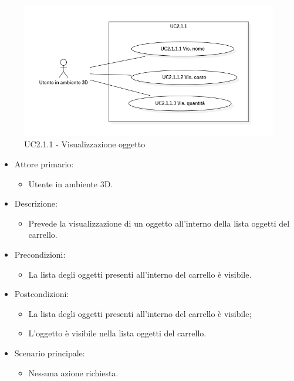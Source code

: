 \begin{figure}[H]
  \renewcommand{\thefigure}{4}
  \includegraphics[width=\linewidth]{./res/images/UC2.1.1.png}
  \caption{UC2.1.1 - Visualizzazione oggetto}
  \label{fig:UC 2.1.1}
\end{figure}

\begin{itemize}
	
	\item Attore primario: 
	\begin{itemize}
		\item Utente in ambiente 3D.
	\end{itemize}
	\item Descrizione:
	\begin{itemize}
		\item Prevede la visualizzazione di un oggetto all'interno della lista oggetti del carrello.
	\end{itemize}
	
	\item Precondizioni:
	\begin{itemize}
		\item La lista degli oggetti presenti all'interno del carrello è visibile.
	\end{itemize}
	
	\item Postcondizioni:
	\begin{itemize}
		\item La lista degli oggetti presenti all'interno del carrello è visibile;
		\item L'oggetto è visibile nella lista oggetti del carrello.
	\end{itemize}
	
	\item Scenario principale:
	\begin{itemize}
		\item Nessuna azione richiesta.
	\end{itemize}
	
\end{itemize}

